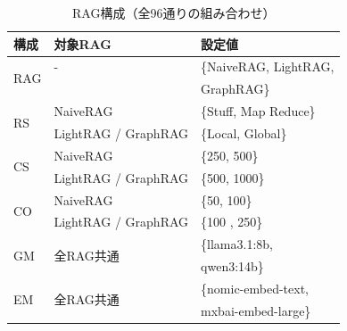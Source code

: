 
\begin{table}[tb]
    \centering
    \small
    \caption{RAG構成（全96通りの組み合わせ）}
    \label{hyperparameters_in_RAG}
    \begin{tabular}{lll}
        \hline
        構成 & 対象RAG & 設定値 \\
        \hline
        \multirow{2}{*}{RAG} & - & \{NaiveRAG, LightRAG, \\ &&GraphRAG\} \\
        \hline
        \multirow{2}{*}{RS} & NaiveRAG & \{Stuff, Map Reduce\} \\ 
        & LightRAG / GraphRAG & \{Local, Global\} \\
        \hline
        \multirow{2}{*}{CS} & NaiveRAG & \{250, 500\} \\ 
        & LightRAG / GraphRAG & \{500, 1000\} \\
        \hline
        \multirow{2}{*}{CO} & NaiveRAG & \{50, 100\} \\ 
        & LightRAG / GraphRAG & \{100 , 250\} \\
        \hline
        \multirow{2}{*}{GM} & \multirow{2}{*}{全RAG共通} 
        & \{llama3.1:8b, \\ && qwen3:14b\} \\
        \hline
        \multirow{2}{*}{EM} & \multirow{2}{*}{全RAG共通} 
        & \{nomic-embed-text, \\ && mxbai-embed-large\} \\
        \hline
    \end{tabular}
\end{table}

